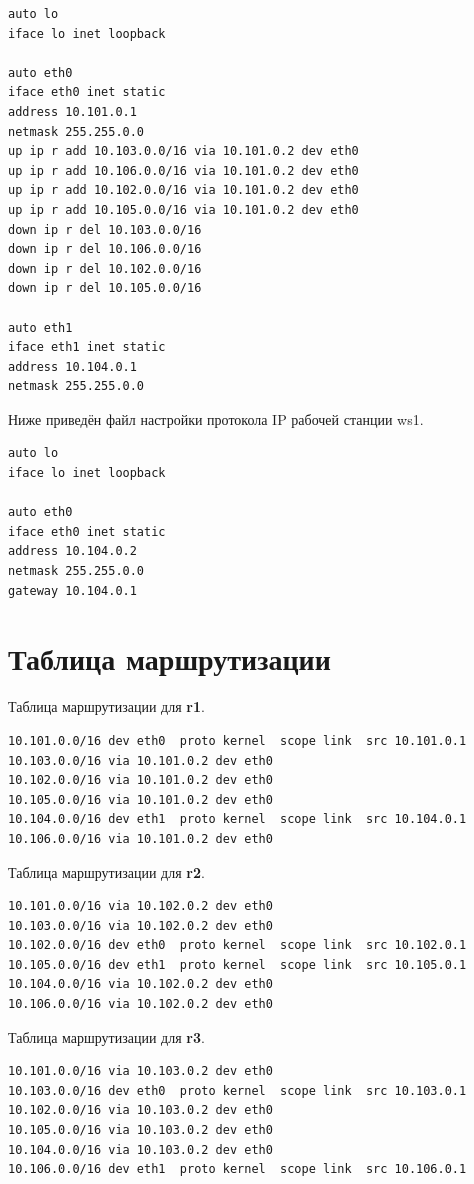 \documentclass[a4paper,12pt]{article}
\begin{document}
\begin{Verbatim}
auto lo
iface lo inet loopback

auto eth0
iface eth0 inet static
address 10.101.0.1
netmask 255.255.0.0
up ip r add 10.103.0.0/16 via 10.101.0.2 dev eth0
up ip r add 10.106.0.0/16 via 10.101.0.2 dev eth0
up ip r add 10.102.0.0/16 via 10.101.0.2 dev eth0
up ip r add 10.105.0.0/16 via 10.101.0.2 dev eth0
down ip r del 10.103.0.0/16
down ip r del 10.106.0.0/16
down ip r del 10.102.0.0/16
down ip r del 10.105.0.0/16

auto eth1
iface eth1 inet static
address 10.104.0.1
netmask 255.255.0.0
\end{Verbatim}

Ниже приведён файл настройки протокола IP рабочей станции ws1.

\begin{Verbatim}
auto lo
iface lo inet loopback

auto eth0
iface eth0 inet static
address 10.104.0.2
netmask 255.255.0.0
gateway 10.104.0.1
\end{Verbatim}


\section{Таблица маршрутизации}

Таблица маршрутизации для \textbf{r1}.

\begin{Verbatim}
10.101.0.0/16 dev eth0  proto kernel  scope link  src 10.101.0.1 
10.103.0.0/16 via 10.101.0.2 dev eth0 
10.102.0.0/16 via 10.101.0.2 dev eth0 
10.105.0.0/16 via 10.101.0.2 dev eth0 
10.104.0.0/16 dev eth1  proto kernel  scope link  src 10.104.0.1 
10.106.0.0/16 via 10.101.0.2 dev eth0 
\end{Verbatim}

Таблица маршрутизации для \textbf{r2}.

\begin{Verbatim}
10.101.0.0/16 via 10.102.0.2 dev eth0 
10.103.0.0/16 via 10.102.0.2 dev eth0 
10.102.0.0/16 dev eth0  proto kernel  scope link  src 10.102.0.1 
10.105.0.0/16 dev eth1  proto kernel  scope link  src 10.105.0.1 
10.104.0.0/16 via 10.102.0.2 dev eth0 
10.106.0.0/16 via 10.102.0.2 dev eth0
\end{Verbatim}

Таблица маршрутизации для \textbf{r3}.

\begin{Verbatim}
10.101.0.0/16 via 10.103.0.2 dev eth0 
10.103.0.0/16 dev eth0  proto kernel  scope link  src 10.103.0.1 
10.102.0.0/16 via 10.103.0.2 dev eth0 
10.105.0.0/16 via 10.103.0.2 dev eth0 
10.104.0.0/16 via 10.103.0.2 dev eth0 
10.106.0.0/16 dev eth1  proto kernel  scope link  src 10.106.0.1 
\end{Verbatim}
\end{document}
